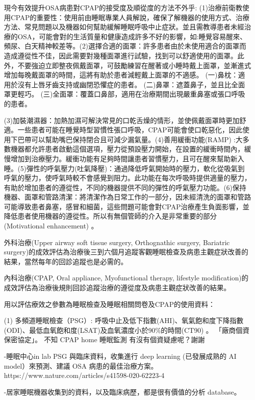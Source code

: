 \documentclass{proposalnsf}
\begin{document}
現今有效提升OSA病患對CPAP的接受度及順從度的方法不外乎: (1)治療前衛教使用CPAP的重要性：使用前由睡眠專業人員解說，確保了解機器的使用方式、治療方法、常見問題以及機器如何幫助緩解睡眠呼吸中止症狀。並且需教導患者未經治療的OSA，可能會對的生活質量和健康造成許多不好的影響，如:睡覺容易醒來、頻尿、白天精神較差等。(2)選擇合適的面罩：許多患者由於未使用適合的面罩而造成遵從性不佳，因此需要對幾種面罩進行試驗，找到可以舒適使用的面罩。此外，不要強迫立即整夜佩戴面罩，可鼓勵練習在醒著或小睡時戴上面罩，並漸進式增加每晚戴面罩的時間，這將有助於患者減輕戴上面罩的不適感。
(一)鼻枕：適用於沒有上唇牙齒支持或幽閉恐懼症的患者。
(二)鼻罩：遮蓋鼻子，並且比全面罩更輕巧。
(三)全面罩：覆蓋口鼻部，適用在治療期間出現嚴重鼻塞或張口呼吸的患者。

(3)加裝潮濕器：加熱加濕可解決常見的口乾舌燥的情形，並使佩戴面罩時更加舒適。一些患者可能在睡覺時型習慣性張口呼吸，CPAP可能會使口乾惡化，因此使用下巴帶可以幫助嘴巴保持閉合且可減少漏氣量。(4)善用緩衝功能(RAMP) :大多數機器都允許患者啟動這個選項，壓力從預設壓力開始，在設置的緩衝時間內，緩慢增加到治療壓力。緩衝功能有足夠時間讓患者習慣壓力，且可在醒來幫助新入睡。(5)彈性的呼氣壓力(吐氣降壓)：通過降低呼氣開始時的壓力，軟化從吸氣到呼氣的壓力，使呼氣時較不會感覺到阻力。此功能在每次呼吸時提供適量的壓力，有助於增加患者的遵從性，不同的機器提供不同的彈性的呼氣壓力功能。(6)保持機器、面罩和管路清潔：將清潔作為日常工作的一部分，因未經清洗的面罩和管路可能導致患者鼻塞，感冒和細菌，這些問題可能會對CPAP治療產生負面影響，並降低患者使用機器的遵從性。所以有無個管師的介入是非常重要的部分(Motivational enhancement) 。

外科治療(Upper airway soft tissue surgery, Orthognathic surgery, Bariatric surgery)的成效評估為治療後三到六個月追蹤客觀睡眠檢查及病患主觀症狀改善的結果，當然每年的回診追蹤也是必需的。

內科治療(CPAP, Oral appliance, Myofunctional therapy, lifestyle modification)的成效評估為治療後規則回診追蹤治療的遵從度及病患主觀症狀改善的結果。

用以評估療效之參數為睡眠檢查及睡眠相關問卷及CPAP的使用資料：

(1) 多頻道睡眠檢查（PSG）: 呼吸中止及低下指數(AHI)、氧氣飽和度下降指數(ODI)、最低血氧飽和度(LSAT)及血氧濃度小於90\%的時間(CT90) 。 
「廠商個資保密協定」。
不知 CPAP
home 睡眠監測 有沒有個資疑慮呢？謝謝

-睡眠中心in lab PSG 與臨床資料，收集進行 deep learning (已發展成熟的 AI model）來預測、建議 OSA 病患的最佳治療方案。https://www.nature.com/articles/s41598-020-62223-4

-居家睡眠機器收集到的資料，以及臨床病歷，都是很有價值的分析 database。
\end{document}
